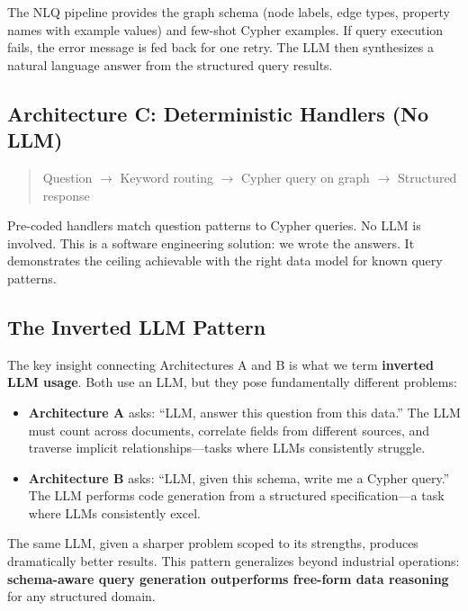 \documentclass[11pt]{article}
\begin{document}
The NLQ pipeline provides the graph schema (node labels, edge types, property names with example values) and few-shot Cypher examples. If query execution fails, the error message is fed back for one retry. The LLM then synthesizes a natural language answer from the structured query results.

\subsection{Architecture C: Deterministic Handlers (No LLM)}

\begin{quote}
Question $\to$ Keyword routing $\to$ Cypher query on graph $\to$ Structured response
\end{quote}

Pre-coded handlers match question patterns to Cypher queries. No LLM is involved. This is a software engineering solution: we wrote the answers. It demonstrates the ceiling achievable with the right data model for known query patterns.

\subsection{The Inverted LLM Pattern}

The key insight connecting Architectures A and B is what we term \textbf{inverted LLM usage}. Both use an LLM, but they pose fundamentally different problems:

\begin{itemize}[leftmargin=*]
  \item \textbf{Architecture A} asks: ``LLM, answer this question from this data.'' The LLM must count across documents, correlate fields from different sources, and traverse implicit relationships---tasks where LLMs consistently struggle.
  \item \textbf{Architecture B} asks: ``LLM, given this schema, write me a Cypher query.'' The LLM performs code generation from a structured specification---a task where LLMs consistently excel.
\end{itemize}

The same LLM, given a sharper problem scoped to its strengths, produces dramatically better results. This pattern generalizes beyond industrial operations: \textbf{schema-aware query generation outperforms free-form data reasoning} for any structured domain.

\end{document}
